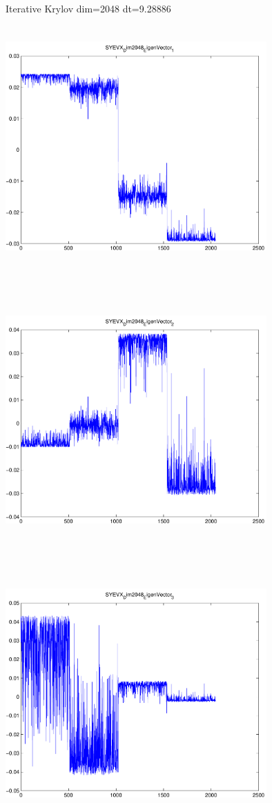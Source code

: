 \documentclass[9pt]{article}
\theoremstyle{plain}
\theoremstyle{definition}
\theoremstyle{remark}
\numberwithin{equation}{section}
\begin{document}
Iterative Krylov dim=2048 dt=9.28886
\includegraphics[width=10.0cm,height=10.0cm]{SYEVX_Dim2048_EigenVector_1.pdf}

\includegraphics[width=10.0cm,height=10.0cm]{SYEVX_Dim2048_EigenVector_2.pdf}

\includegraphics[width=10.0cm,height=10.0cm]{SYEVX_Dim2048_EigenVector_3.pdf}
\end{document}
